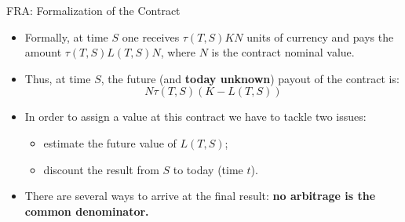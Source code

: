 \documentclass{beamer}
\begin{document}
\begin{frame}{FRA: Formalization of the Contract}
	\begin{itemize}
		\item<1-> Formally, at time $S$ one receives $\tau(T, S)KN$ units of currency and pays the amount $\tau(T,S)L(T,S)N$, where $N$ is the contract nominal value.
		\item<2-> Thus, at time $S$, the future (and \textbf{today unknown}) payout of the contract is: 
		\begin{equation}
			N\tau(T,S)(K-L(T,S))
			\label{eq:fra_payoff}
		\end{equation}
		\item<3-> In order to assign a value at this contract we have to tackle two issues:
		\begin{itemize}
			\item<4-> estimate the future value of $L(T, S)$;
			\item<5-> discount the result from $S$ to today (time $t$).
		\end{itemize}
		\item<6-> There are several ways to arrive at the final result: \textbf{no arbitrage is the common denominator.}
	\end{itemize}
\end{frame}

%	
%	
\end{document}
